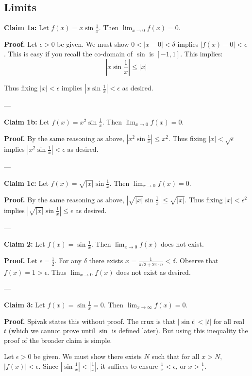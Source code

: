\clearpage
\subsection{Limits}

\textbf{Claim 1a:} Let $f(x)=x\sin \frac{1}{x}$. Then
$\lim_{x\to0}f(x)=0$.

\textbf{Proof.} Let $\epsilon>0$ be given. We must show
$0<|x-0|<\delta$ implies $|f(x)-0|<\epsilon$. This is easy if you recall
the co-domain of $\sin$ is $[-1,1]$. This implies:
\[\left|x\sin \frac{1}{x}\right|\leq |x|\]

Thus fixing $|x|<\epsilon$ implies
$\left|x\sin \frac{1}{x}\right|<\epsilon$ as desired.



\vs---\vs

\textbf{Claim 1b:} Let $f(x)=x^2\sin \frac{1}{x}$. Then
$\lim_{x\to0}f(x)=0$.

\textbf{Proof.} By the same reasoning as above,
$\left|x^2\sin \frac{1}{x}\right|\leq x^2$. Thus fixing $|x|<\sqrt{\epsilon}$
implies $\left|x^2\sin \frac{1}{x}\right|<\epsilon$ as desired.

\vs---\vs

\textbf{Claim 1c:} Let $f(x)=\sqrt{|x|}\sin \frac{1}{x}$. Then
$\lim_{x\to0}f(x)=0$.

\textbf{Proof.} By the same reasoning as above,
$\left|\sqrt{|x|}\sin \frac{1}{x}\right|\leq \sqrt{|x|}$. Thus fixing
$|x|<\epsilon^2$ implies
$\left|\sqrt{|x|}\sin \frac{1}{x}\right|\leq \epsilon$ as desired.


\vs---\vs

\textbf{Claim 2:}\label{limits-claim-2} Let $f(x)=\sin \frac{1}{x}$.
Then $\lim_{x\to0}f(x)$ does not exist.

\textbf{Proof.} Let $\epsilon=\frac{1}{2}$. For any $\delta$ there exists
$x=\frac{1}{\pi/2+2\pi\cdot n}<\delta$. Observe that
$f(x)=1>\epsilon$. Thus $\lim_{x\to0}f(x)$ does not exist as desired.

\vs---\vs

\textbf{Claim 3:} Let $f(x)=\sin \frac{1}{x}=0$. Then
$\lim_{x\to\infty}f(x)=0$.

\textbf{Proof.} Spivak states this without proof. The crux is that
$|\sin t|<|t|$ for all real $t$ (which we cannot prove until $\sin$ is
defined later). But using this inequality the proof of the broader
claim is simple.

\vs

Let $\epsilon>0$ be given. We must show there exists $N$ such that for all
$x>N$, $|f(x)|<\epsilon$. Since
$\left|\sin \frac{1}{x}\right|<\left|\frac{1}{x}\right|$, it suffices
to ensure $\frac{1}{x}<\epsilon$, or $x>\frac{1}{\epsilon}$.

